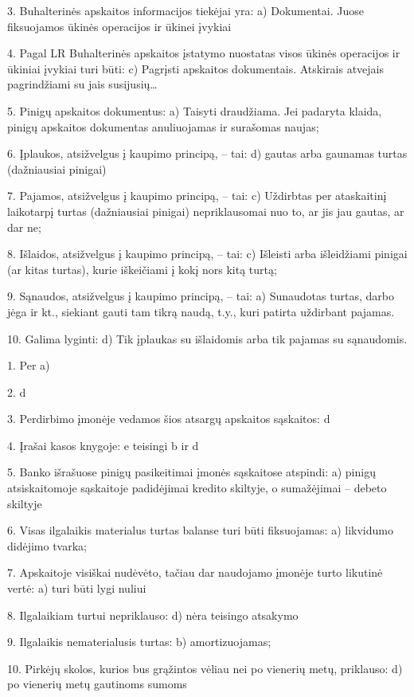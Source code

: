 3. Buhalterinės apskaitos informacijos tiekėjai yra:
a) Dokumentai. Juose fiksuojamos ūkinės operacijos ir ūkinei įvykiai

4. Pagal LR Buhalterinės apskaitos įstatymo nuostatas visos ūkinės
operacijos ir ūkiniai įvykiai turi būti:
c) Pagrįsti apskaitos dokumentais. Atskirais atvejais pagrindžiami su jais
susijusių…

5. Pinigų apskaitos dokumentus:
a) Taisyti draudžiama. Jei padaryta klaida, pinigų apskaitos dokumentas
anuliuojamas ir surašomas naujas;

6. Įplaukos, atsižvelgus į kaupimo principą, – tai:
d) gautas arba gaunamas turtas (dažniausiai pinigai)

7. Pajamos, atsižvelgus į kaupimo principą, – tai:
c) Uždirbtas per ataskaitinį laikotarpį turtas (dažniausiai pinigai)
nepriklausomai nuo to, ar jis jau gautas, ar dar ne;

8. Išlaidos, atsižvelgus į kaupimo principą, – tai:
c) Išleisti arba išleidžiami pinigai (ar kitas turtas), kurie iškeičiami
į kokį nors kitą turtą;

9. Sąnaudos, atsižvelgus į kaupimo principą, – tai:
a) Sunaudotas turtas, darbo jėga ir kt., siekiant gauti tam tikrą naudą,
t.y., kuri patirta uždirbant pajamas.

10. Galima lyginti:
d)  Tik įplaukas su išlaidomis arba tik pajamas su sąnaudomis.

1. Per
a)

2. 
d

3. Perdirbimo įmonėje vedamos šios atsargų apskaitos sąskaitos:
d

4. Įrašai kasos knygoje:
e  teisingi b ir d

5. Banko išrašuose pinigų pasikeitimai įmonės sąskaitose atspindi:
a) pinigų atsiskaitomoje sąskaitoje padidėjimai kredito skiltyje, o
sumažėjimai – debeto skiltyje

6. Visas ilgalaikis materialus turtas balanse turi būti fiksuojamas:
a) likvidumo didėjimo tvarka;

7. Apskaitoje visiškai nudėvėto, tačiau dar naudojamo įmonėje turto
likutinė vertė:
a) turi būti lygi nuliui

8. Ilgalaikiam turtui nepriklauso:
d) nėra teisingo atsakymo

9. Ilgalaikis nematerialusis turtas:
b) amortizuojamas;

10. Pirkėjų skolos, kurios bus grąžintos vėliau nei po vienerių metų,
priklauso:
d) po vienerių metų gautinoms sumoms


